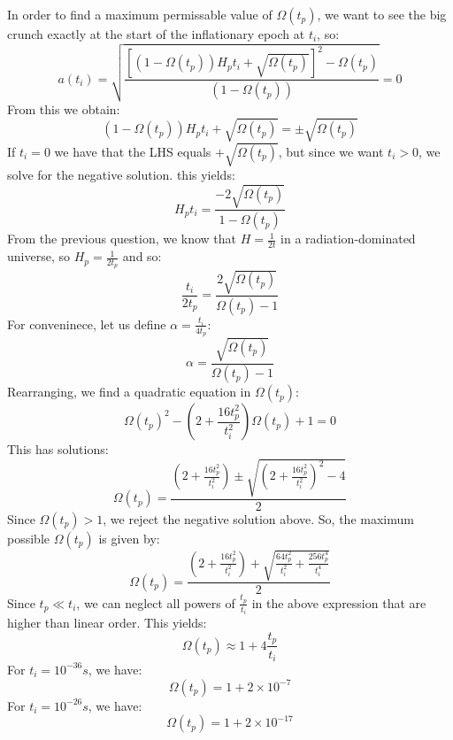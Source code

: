 In order to find a maximum permissable value of $\Omega(t_p)$, we want to see the big crunch exactly at the start of the inflationary epoch at $t_i$, so:
\begin{equation}
    a(t_i) =  \sqrt{\frac{\left[(1 - \Omega(t_p))H_p t_i +  \sqrt{\Omega(t_p)} \right]^2 - \Omega(t_p)}{(1 - \Omega(t_p))}} = 0
\end{equation}
From this we obtain:
\begin{equation}
    (1 - \Omega(t_p))H_p t_i +  \sqrt{\Omega(t_p)}= \pm \sqrt{\Omega(t_p)}
\end{equation}
If $t_i = 0$ we have that the LHS equals $+ \sqrt{\Omega(t_p)}$, but since we want $t_i > 0$, we solve for the negative solution. this yields:
\begin{equation}
    H_pt_i = \frac{-2\sqrt{\Omega(t_p)}}{1 - \Omega(t_p)}
\end{equation}
From the previous question, we know that $H = \frac{1}{2t}$ in a radiation-dominated universe, so $H_p = \frac{1}{2t_p}$ and so:
\begin{equation}
    \frac{t_i}{2t_p} = \frac{2\sqrt{\Omega(t_p)}}{\Omega(t_p) - 1}
\end{equation}
For conveninece, let us define $\alpha = \frac{t_i}{4t_p}$:
\begin{equation}
    \alpha = \frac{\sqrt{\Omega(t_p)}}{\Omega(t_p) - 1}
\end{equation}
Rearranging, we find a quadratic equation in $\Omega(t_p)$:
\begin{equation}
    \Omega(t_p)^2 - (2 + \frac{16 t_p^2}{t_i^2})\Omega(t_p) + 1 = 0
\end{equation}
This has solutions:
\begin{equation}
    \Omega(t_p) = \frac{(2 + \frac{16 t_p^2}{t_i^2}) \pm \sqrt{(2 + \frac{16 t_p^2}{t_i^2})^2 - 4}}{2}
\end{equation}
Since $\Omega(t_p) > 1$, we reject the negative solution above. So, the maximum possible $\Omega(t_p)$ is given by:
\begin{equation}
    \boxed{\Omega(t_p) = \frac{(2 + \frac{16 t_p^2}{t_i^2}) +  \sqrt{\frac{64 t_p^2}{t_i^2} + \frac{256 t_p^4}{t_i^4}}}{2}}
\end{equation}
Since $t_p \ll t_i$, we can neglect all powers of $\frac{t_p}{t_i}$ in the above expression that are higher than linear order. This yields:
\begin{equation}
    \boxed{\Omega(t_p) \approx 1 + 4\frac{t_p}{t_i}}
\end{equation}
For $t_i = 10^{-36}\si{s}$, we have:
\begin{equation}
    \boxed{\Omega(t_p) = 1 + 2 \times 10^{-7}}
\end{equation}
For $t_i = 10^{-26}\si{s}$, we have:
\begin{equation}
    \boxed{\Omega(t_p) = 1 + 2 \times 10^{-17}}
\end{equation}

